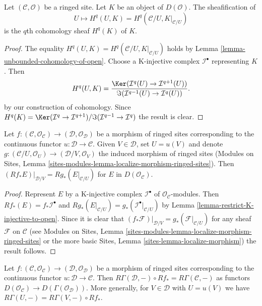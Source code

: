 \begin{lemma}
\label{lemma-sheafification-cohomology}
Let $(\mathcal{C}, \mathcal{O})$ be a ringed site. Let $K$ be an object of
$D(\mathcal{O})$. The sheafification of
$$
U \mapsto H^q(U, K) = H^q(\mathcal{C}/U, K|_{\mathcal{C}/U})
$$
is the $q$th cohomology sheaf $H^q(K)$ of $K$.
\end{lemma}

\begin{proof}
The equality $H^q(U, K) = H^q(\mathcal{C}/U, K|_{\mathcal{C}/U})$
holds by Lemma \ref{lemma-unbounded-cohomology-of-open}.
Choose a K-injective complex $\mathcal{I}^\bullet$ representing $K$.
Then
$$
H^q(U, K) =
\frac{\Ker(\mathcal{I}^q(U) \to \mathcal{I}^{q + 1}(U))}
{\Im(\mathcal{I}^{q - 1}(U) \to \mathcal{I}^q(U))}.
$$
by our construction of cohomology. Since
$H^q(K) = \Ker(\mathcal{I}^q \to \mathcal{I}^{q + 1})/
\Im(\mathcal{I}^{q - 1} \to \mathcal{I}^q)$ the result is clear.
\end{proof}

\begin{lemma}
\label{lemma-restrict-direct-image-open}
Let $f : (\mathcal{C}, \mathcal{O}_\mathcal{C}) \to
(\mathcal{D}, \mathcal{O}_\mathcal{D})$ be a morphism of ringed sites
corresponding to the continuous functor $u : \mathcal{D} \to \mathcal{C}$.
Given $V \in \mathcal{D}$, set $U = u(V)$ and denote
$g : (\mathcal{C}/U, \mathcal{O}_U) \to (\mathcal{D}/V, \mathcal{O}_V)$
the induced morphism of ringed sites
(Modules on Sites, Lemma
\ref{sites-modules-lemma-localize-morphism-ringed-sites}).
Then $(Rf_*E)|_{\mathcal{D}/V} = Rg_*(E|_{\mathcal{C}/U})$
for $E$ in $D(\mathcal{O}_\mathcal{C})$.
\end{lemma}

\begin{proof}
Represent $E$ by a K-injective complex $\mathcal{I}^\bullet$ of
$\mathcal{O}_\mathcal{C}$-modules. Then
$Rf_*(E) = f_*\mathcal{I}^\bullet$
and $Rg_*(E|_{\mathcal{C}/U}) = g_*(\mathcal{I}^\bullet|_{\mathcal{C}/U})$ by
Lemma \ref{lemma-restrict-K-injective-to-open}.
Since it is clear that
$(f_*\mathcal{F})|_{\mathcal{D}/V} = g_*(\mathcal{F}|_{\mathcal{C}/U})$
for any sheaf $\mathcal{F}$ on $\mathcal{C}$
(see Modules on Sites, Lemma
\ref{sites-modules-lemma-localize-morphism-ringed-sites} or the more basic
Sites, Lemma \ref{sites-lemma-localize-morphism})
the result follows.
\end{proof}

\begin{lemma}
\label{lemma-Leray-unbounded}
Let $f : (\mathcal{C}, \mathcal{O}_\mathcal{C}) \to
(\mathcal{D}, \mathcal{O}_\mathcal{D})$ be a morphism of ringed sites
corresponding to the continuous functor $u : \mathcal{D} \to \mathcal{C}$.
Then $R\Gamma(\mathcal{D}, -) \circ Rf_* = R\Gamma(\mathcal{C}, -)$ as
functors $D(\mathcal{O}_\mathcal{C}) \to D(\Gamma(\mathcal{O}_\mathcal{D}))$.
More generally, for $V \in \mathcal{D}$ with $U = u(V)$
we have $R\Gamma(U, -) = R\Gamma(V, -) \circ Rf_*$.
\end{lemma}

